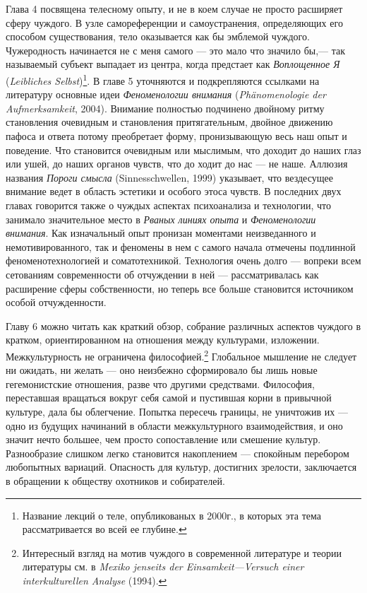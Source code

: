 \documentclass[12pt]{book}
\begin{document}
Глава 4 посвящена телесному опыту, и не в коем случае не просто расширяет сферу чуждого. В узле самореференции и самоустранения, определяющих его способом существования, тело оказывается как бы эмблемой чуждого. Чужеродность начинается не с меня самого --- это мало что значило бы,--- так называемый субъект выпадает из центра, когда предстает как \textit{Воплощенное Я} (\textit{Leibliches Selbst})\footnote{Название лекций о теле, опубликованых в 2000г., в которых эта тема рассматривается во всей ее глубине.}. В главе 5 уточняются и подкрепляются ссылками на литературу основные идеи \textit{Феноменологии внимания} (\textit{Phänomenologie der Aufmerksamkeit}, 2004). Внимание полностью подчинено двойному ритму становления очевидным и становления притягательным, двойное движению пафоса и ответа потому преобретает форму, пронизывающую весь наш опыт и поведение. Что становится очевидным или мыслимым, что доходит до наших глаз или ушей, до наших органов чувств, что до ходит до нас --- не наше. Аллюзия названия \textit{Пороги смысла} (Sinnesschwellen, 1999) указывает, что вездесущее внимание ведет в область эстетики и особого этоса чувств. В последних двух главах говорится также о чуждых аспектах психоанализа и технологии, что занимало значительное место в \textit{Рваных линиях опыта} и \textit{Феноменологии внимания}. Как изначальный опыт пронизан моментами неизведанного и немотивированного, так и феномены в нем с самого начала отмечены подлинной феноменотехнологией и соматотехникой. Технология очень долго --- вопреки всем сетованиям современности об отчуждении в ней --- рассматривалась как расширение сферы собственности, но теперь все больше становится источником особой отчужденности.

Главу 6 можно читать как краткий обзор, собрание различных аспектов чуждого в кратком, ориентированном на отношения между культурами, изложении. Межкультурность не ограничена философией.\footnote{Интересный взгляд на мотив чуждого в современной литературе и теории литературы см. в \textit{Mexiko jenseits der Einsamkeit—Versuch einer interkulturellen Analyse} (1994).} Глобальное мышление не следует ни ожидать, ни желать --- оно неизбежно сформировало бы лишь новые гегемонистские отношения, разве что другими средствами. Философия, переставшая вращаться вокруг себя самой и пустившая корни в привычной культуре, дала бы облегчение. Попытка пересечь границы, не уничтожив их --- одно из будущих начинаний в области межкультурного взаимодействия, и оно значит нечто большее, чем просто сопоставление или смешение культур. Разнообразие слишком легко становится накоплением --- спокойным перебором любопытных вариаций. Опасность для культур, достигних зрелости, заключается в обращении к обществу охотников и собирателей.
\end{document}
